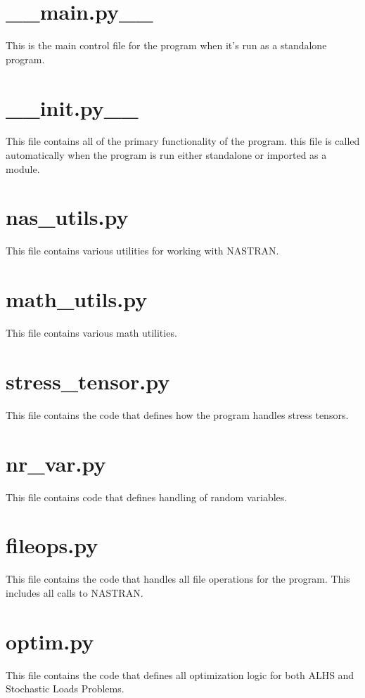 \section{\_\_main.py\_\_}
This is the main control file for the program when it's run as a standalone program. 


\newpage
\section{\_\_init.py\_\_}
This file contains all of the primary functionality of the program. this file is called automatically when the program is run either standalone or imported as a module. 


\newpage
\section{nas\_utils.py}
This file contains various utilities for working with NASTRAN. 


\newpage
\section{math\_utils.py}
This file contains various math utilities. 


\newpage
\section{stress\_tensor.py}
This file contains the code that defines how the program handles stress tensors. 


\newpage
\section{nr\_var.py}
This file contains code that defines handling of random variables. 


\newpage
\section{fileops.py}
This file contains the code that handles all file operations for the program. This includes all calls to NASTRAN. 


\newpage
\section{optim.py}
This file contains the code that defines all optimization logic for both ALHS and Stochastic Loads Problems.

